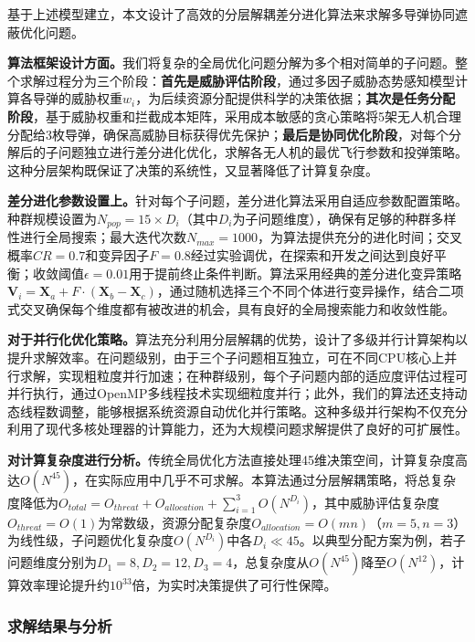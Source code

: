 \documentclass[fontset=SimSun]{ctexart}
\begin{document}
基于上述模型建立，本文设计了高效的分层解耦差分进化算法来求解多导弹协同遮蔽优化问题。

\textbf{算法框架设计方面。}我们将复杂的全局优化问题分解为多个相对简单的子问题。整个求解过程分为三个阶段：\textbf{首先是威胁评估阶段}，通过多因子威胁态势感知模型计算各导弹的威胁权重$w_i$，为后续资源分配提供科学的决策依据；\textbf{其次是任务分配阶段}，基于威胁权重和拦截成本矩阵，采用成本敏感的贪心策略将5架无人机合理分配给3枚导弹，确保高威胁目标获得优先保护；\textbf{最后是协同优化阶段}，对每个分解后的子问题独立进行差分进化优化，求解各无人机的最优飞行参数和投弹策略。这种分层架构既保证了决策的系统性，又显著降低了计算复杂度。

\textbf{差分进化参数设置上。}针对每个子问题，差分进化算法采用自适应参数配置策略。种群规模设置为$N_{pop} = 15 \times D_i$（其中$D_i$为子问题维度），确保有足够的种群多样性进行全局搜索；最大迭代次数$N_{max} = 1000$，为算法提供充分的进化时间；交叉概率$CR = 0.7$和变异因子$F = 0.8$经过实验调优，在探索和开发之间达到良好平衡；收敛阈值$\epsilon = 0.01$用于提前终止条件判断。算法采用经典的差分进化变异策略$\mathbf{V}_i = \mathbf{X}_a + F \cdot (\mathbf{X}_b - \mathbf{X}_c)$，通过随机选择三个不同个体进行变异操作，结合二项式交叉确保每个维度都有被改进的机会，具有良好的全局搜索能力和收敛性能。

\textbf{对于并行化优化策略。}算法充分利用分层解耦的优势，设计了多级并行计算架构以提升求解效率。在问题级别，由于三个子问题相互独立，可在不同CPU核心上并行求解，实现粗粒度并行加速；在种群级别，每个子问题内部的适应度评估过程可并行执行，通过OpenMP多线程技术实现细粒度并行；此外，我们的算法还支持动态线程数调整，能够根据系统资源自动优化并行策略。这种多级并行架构不仅充分利用了现代多核处理器的计算能力，还为大规模问题求解提供了良好的可扩展性。

\textbf{对计算复杂度进行分析。}传统全局优化方法直接处理45维决策空间，计算复杂度高达$O(N^{45})$，在实际应用中几乎不可求解。本算法通过分层解耦策略，将总复杂度降低为$O_{total} = O_{threat} + O_{allocation} + \sum_{i=1}^{3} O(N^{D_i})$，其中威胁评估复杂度$O_{threat} = O(1)$为常数级，资源分配复杂度$O_{allocation} = O(mn)$（$m=5, n=3$）为线性级，子问题优化复杂度$O(N^{D_i})$中各$D_i \ll 45$。以典型分配方案为例，若子问题维度分别为$D_1=8, D_2=12, D_3=4$，总复杂度从$O(N^{45})$降至$O(N^{12})$，计算效率理论提升约$10^{33}$倍，为实时决策提供了可行性保障。


\subsubsection{求解结果与分析}
\end{document}
